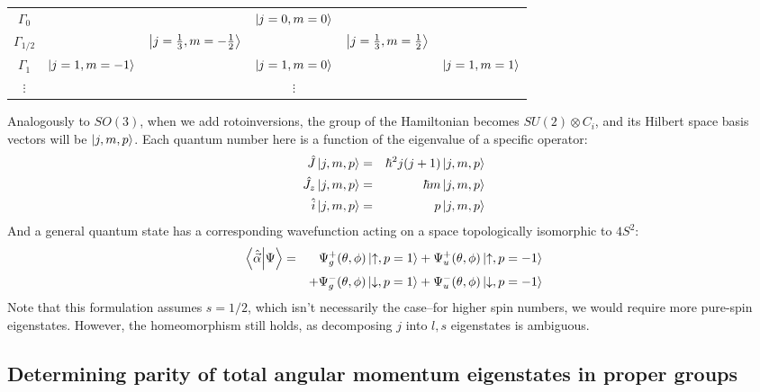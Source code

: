 \documentclass[12pt]{article}
\begin{document}
	\begin{center}
	\begin{tabular}{c|c c c c c}
	$\Gamma_0$ & & & $\ket{j=0, m=0}$ & &\\
	$\Gamma_{1/2}$ & & $\ket{j=\frac{1}{3},m=-\frac{1}{2}}$ & & $\ket{j=\frac{1}{3},m=\frac{1}{2}}$ &\\
	$\Gamma_1$ & $\ket{j=1,m=-1}$ & & $\ket{j=1,m=0}$ & & $\ket{j=1,m=1}$\\
	$\vdots$ & & & $\vdots$ & &
	\end{tabular}
	\end{center}
	
	Analogously to $SO(3)$, when we add rotoinversions, the group of the Hamiltonian becomes $SU(2)\otimes C_i$, and its Hilbert space basis vectors will be $\ket{j,m,p}$. Each quantum number here is a function of the eigenvalue of a specific operator:
	\begin{eqnarray*}
	\hat{J}\ket{j,m,p}&=&\hbar^2 j(j+1)\ket{j,m,p}\\
	\hat{J_z}\ket{j,m,p}&=&\hbar m\ket{j,m,p}\\
	\hat{i}\ket{j,m,p}&=&p\ket{j,m,p}
	\end{eqnarray*}
	And a general quantum state has a corresponding wavefunction acting on a space topologically isomorphic to $4S^2$:
	\begin{eqnarray*}		
	\braket{\hat{\vec{\alpha}}}{\Psi}&=&\Psi_g^+(\theta,\phi)\ket{\uparrow,p=1}+\Psi_u^+(\theta,\phi)\ket{\uparrow,p=-1}\\
	&&+\Psi_g^-(\theta,\phi)\ket{\downarrow,p=1}+\Psi_u^-(\theta,\phi)\ket{\downarrow,p=-1}
	\end{eqnarray*}
	Note that this formulation assumes $s=1/2$, which isn't necessarily the case--for higher spin numbers, we would require more pure-spin eigenstates. However, the homeomorphism still holds, as decomposing $j$ into $l,s$ eigenstates is ambiguous.
	
	\subsection{Determining parity of total angular momentum eigenstates in proper groups}
	
\end{document}

